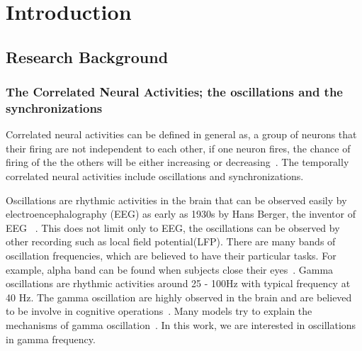 \chapter{Introduction}




\section{Research Background	}
\subsection{The Correlated Neural Activities; the oscillations and the synchronizations}

Correlated neural activities can be defined in general as, a group of neurons that their firing are not independent to each other, if one neuron fires, the chance of firing of the the others will be either  increasing or decreasing~\cite{salinas2001correlated}. The temporally correlated neural activities include oscillations and synchronizations. 

Oscillations are rhythmic activities in the brain that can be observed easily by electroencephalography (EEG) as early as 1930s by Hans Berger, the inventor of EEG ~\cite{haas2003hans}. This does not limit only to EEG, the oscillations can be observed by other recording such as local field potential(LFP). 
There are many bands of oscillation frequencies, which are believed to have their particular tasks. For example, alpha band can be found when subjects close their eyes~\cite{buzsaki2004neuronal}.  Gamma oscillations are rhythmic activities around 25 - 100Hz with typical frequency at 40 Hz. The gamma oscillation are highly observed in the brain and are believed to be involve in cognitive operations~\cite{singer1995visual, engel2001temporal, fries2005mechanism}.  Many models try to explain the mechanisms of gamma oscillation~\cite{wang1996gamma,whittington1995synchronized,  wilson1972excitatory, brunel2003determines,gray1996chattering, buzsaki2012mechanisms}.  In this work, we are interested in oscillations in gamma frequency.

